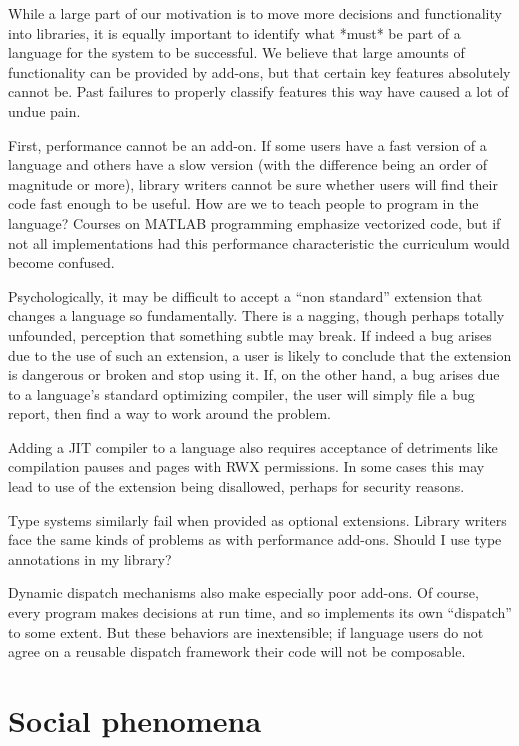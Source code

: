 {While a large part of our motivation is to move more decisions and functionality
into libraries, it is equally important to identify what *must* be part of a
language for the system to be successful. We believe that large amounts of
functionality can be provided by add-ons, but that certain key features
absolutely cannot be. Past failures to properly classify features this way have
caused a lot of undue pain.

First, performance cannot be an add-on. If some users have a fast version of
a language and others have a slow version (with the difference being an
order of magnitude or more), library writers cannot be sure whether users
will find their code fast enough to be useful. How are we to teach people to
program in the language? Courses on MATLAB programming emphasize vectorized code,
but if not all implementations had this performance characteristic the
curriculum would become confused.

Psychologically, it may be difficult to accept a ``non standard'' extension
that changes a language so fundamentally. There is a nagging, though perhaps
totally unfounded, perception that something subtle may break. If indeed a
bug arises due to the use of such an extension, a user is likely to conclude
that the extension is dangerous or broken and stop using it. If, on the other
hand, a bug arises due to a language's standard optimizing compiler, the user
will simply file a bug report, then find a way to work around the problem.

Adding a JIT compiler to a language also requires acceptance of detriments
like compilation pauses and pages with RWX permissions. In some cases this
may lead to use of the extension being disallowed, perhaps for security
reasons.

Type systems similarly fail when provided as optional extensions. Library
writers face the same kinds of problems as with performance add-ons. Should I
use type annotations in my library?

Dynamic dispatch mechanisms also make especially poor add-ons. Of course,
every program makes decisions at run time, and so implements its own
``dispatch'' to some extent. But these behaviors are inextensible; if
language users do not agree on a reusable dispatch framework their code
will not be composable.


\section{Social phenomena}

}
